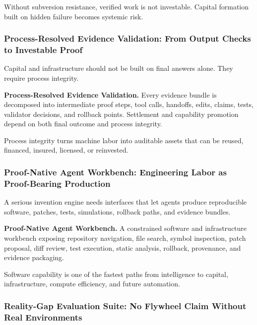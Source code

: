 \documentclass[
  11pt,
]{article}
\begin{document}
Without subversion resistance, verified work is not investable. Capital
formation built on hidden failure becomes systemic risk.

\subsubsection{Process-Resolved Evidence Validation: From Output Checks
to Investable
Proof}\label{process-resolved-evidence-validation-from-output-checks-to-investable-proof}

Capital and infrastructure should not be built on final answers alone.
They require process integrity.

\textbf{Process-Resolved Evidence Validation.} Every evidence bundle is
decomposed into intermediate proof steps, tool calls, handoffs, edits,
claims, tests, validator decisions, and rollback points. Settlement and
capability promotion depend on both final outcome and process integrity.

Process integrity turns machine labor into auditable assets that can be
reused, financed, insured, licensed, or reinvested.

\subsubsection{Proof-Native Agent Workbench: Engineering Labor as
Proof-Bearing
Production}\label{proof-native-agent-workbench-engineering-labor-as-proof-bearing-production}

A serious invention engine needs interfaces that let agents produce
reproducible software, patches, tests, simulations, rollback paths, and
evidence bundles.

\textbf{Proof-Native Agent Workbench.} A constrained software and
infrastructure workbench exposing repository navigation, file search,
symbol inspection, patch proposal, diff review, test execution, static
analysis, rollback, provenance, and evidence packaging.

Software capability is one of the fastest paths from intelligence to
capital, infrastructure, compute efficiency, and future automation.

\subsubsection{Reality-Gap Evaluation Suite: No Flywheel Claim Without
Real
Environments}\label{reality-gap-evaluation-suite-no-flywheel-claim-without-real-environments}
\end{document}
